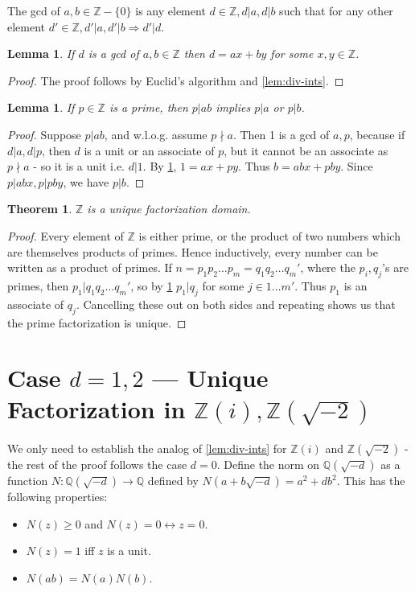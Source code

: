 \documentclass[12pt]{article}
\newcommand{\ints}{{\mathbb{Z}}}
\newcommand{\qf}{{\mathbb{Q}}}
\newtheorem{theorem}[thm]{Theorem}
\newtheorem{lemma}[thm]{Lemma}
\begin{document}
The gcd of $a, b \in \ints - \{0\}$ is any element $d \in \ints, d | a, d | b$ such that for any other element $d' \in \ints, d'|a, d' | b \Rightarrow d' | d$.

\begin{lemma}\label{lem:euclid-ints}
If $d$ is a gcd of $a, b \in  \ints$ then $d = ax + by$ for some $x, y \in \ints$.
\end{lemma}
\begin{proof}
The proof follows by Euclid's algorithm and \cref{lem:div-ints}.
\end{proof}

\begin{lemma}\label{lem:prime-ints}
If $p \in \ints$ is a prime, then $p | ab$ implies $p | a$ or $p | b$.
\end{lemma}
\begin{proof}
Suppose $p | ab$, and w.l.o.g. assume $p \nmid a$. Then 1 is a gcd of $a, p$, because if $d | a, d | p$, then $d$ is a unit or an associate of $p$, but it cannot be an associate as $p \nmid a$ - so it is a unit i.e. $d | 1$. 
By \cref{lem:euclid-ints}, $1 = ax + py$.  Thus $b = abx + pby$. Since $p | abx, p | pby$, we have $p | b$.
\end{proof}

\begin{theorem}
$\ints$ is a unique factorization domain.
\end{theorem}
\begin{proof}
Every element of $\ints$ is either prime, or the product of two numbers which are themselves products of primes. Hence inductively, every number can be written as a product of primes. If $n = p_1 p_2 \ldots p_m = q_1 q_2\ldots q_m'$, where the $p_i, q_j$'s are primes, then $p_1 | q_1 q_2\ldots q_m'$, so by \cref{lem:prime-ints} $p_1 | q_j$ for some $j \in 1\ldots m'$. Thus $p_1$ is an associate of $q_j$. Cancelling these out on both sides and repeating shows us that the prime factorization is unique.
\end{proof}

\section{Case $d = 1, 2$ --- Unique Factorization in $\ints(i), \ints(\sqrt{-2})$}
We only need to establish the analog of \cref{lem:div-ints} for $\ints(i)$ and $\ints(\sqrt{-2})$ - the rest of the proof follows the case $d = 0$. Define the norm on $\qf(\sqrt{-d})$ as a function $N: \qf(\sqrt{-d}) \to \qf$ defined by $N(a + b\sqrt{-d}) = a^2 + db^2$. This has the following properties:
\begin{itemize}
\item $N(z) \geq 0$ and $N(z) = 0 \leftrightarrow z = 0$.
\item $N(z) = 1$ iff $z$ is a unit.
\item $N(ab) = N(a)N(b)$.
\end{itemize}
\end{document}
